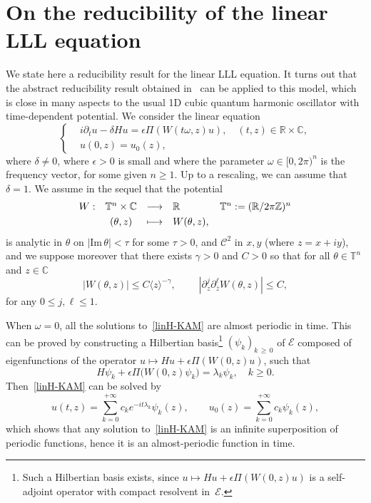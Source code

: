 \documentclass[AHL,Unicode,published]{cedram}
\newcommand{\C}{\mathbb{C}}
\newcommand{\R}{\mathbb{R}}
\newcommand{\T}{\mathbb{T}}
\newcommand{\Z}{\mathbb{Z}}
\newcommand{\E}{\mathcal{E}}
\newcommand{\clC}{\mathcal{C}}
\newcommand*\eps{\epsilon}
\newcommand*\dis{\displaystyle}
\newcommand{\om}{\omega}
\newcommand{\ov}{\overline}
\newcommand{\<}{\langle}
\renewcommand{\>}{\rangle}
\newcommand{\R}{\mathbb{R}}
\begin{document}
\section{On the reducibility of the linear LLL equation}\label{appendixB}

We state here a reducibility result for the linear LLL equation. It turns out that the abstract reducibility result obtained in~\cite{Grebert-Thomann} can be applied to this model, which is close in many aspects to the usual 1D cubic quantum harmonic oscillator with time-dependent potential. We consider the linear equation
\begin{equation}\label{linH-KAM}
\begin{cases}
&i\partial_t u-\delta Hu=\eps \Pi(W(t \om,z)u), \quad (t,z)\in \R\times \C,\\
&u(0,z)= u_0(z),
\end{cases}
\end{equation}
where $\delta \neq 0$, where $\epsilon >0$ is small and where the parameter $\omega \in [0,2\pi)^n$ is the frequency vector, for some given $n
\geq 1$. Up to a rescaling, we can assume that $\delta =1$. We assume in the sequel that the potential
\[
\begin{array}{rccl}
W : &\T^n\times \C&\longrightarrow&\R \qquad \qquad \T^n: =(\R/2\pi \Z)^n\\[3pt]
\dis & (\theta, z) &\longmapsto & W(\theta,z),
\end{array}
\]
is analytic in $\theta$ on $|\text{Im}\,\theta|<\tau$ for some $\tau>0$, and $\clC^{2}$ in $x,y$ (where $z=x+iy$), and we suppose moreover that there exists $\gamma>0$ and $C>0$ so that for all $\theta \in \T^{n}$ and $z\in \C$
\begin{equation}\label{cond-W}
|W(\theta,z)|\leq C\<z\>^{-\gamma},\qquad\; \left|\partial^j_{z}\partial^{\ell}_{\ov z}W(\theta,z)\right|\leq C,
\end{equation}
for any $0 \leq j, \ell \leq 1$.

When $\om =0$, all the solutions to~\eqref{linH-KAM} are almost periodic in time. This can be proved by constructing a Hilbertian basis\footnote{Such a Hilbertian basis exists, since $u \mapsto Hu+\eps \Pi(W(0,z)u)$ is a self-adjoint operator with compact resolvent in~$\E$.} $(\psi_k)_{k\,\geq\,0}$ of $\E$ composed of eigenfunctions of the operator $u \mapsto Hu+\eps \Pi(W(0,z)u)$, such that
\[
H\psi_k+\eps \Pi\big(W(0,z)\psi_k\big)=\lambda_k \psi_k, \quad k \geq 0.
\]
Then~\eqref{linH-KAM} can be solved by
\[
u(t,z)= \sum_{k=0}^{+\infty}c_k e^{-it \lambda_k } \psi_k(z), \qquad u_0(z)= \sum_{k=0}^{+\infty}c_k \psi_k(z),
\]
which shows that any solution to~\eqref{linH-KAM} is an infinite superposition of periodic functions, hence it is an almost-periodic function in time.
\end{document}
